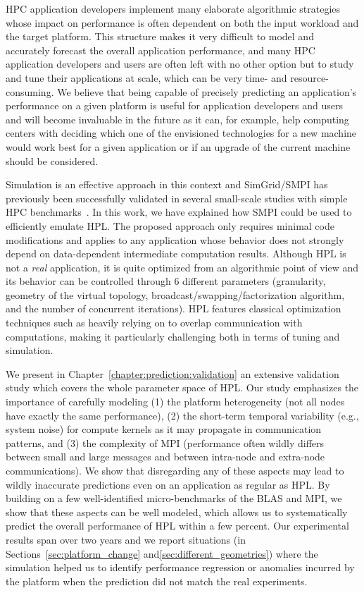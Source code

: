     HPC application developers implement many elaborate algorithmic strategies whose impact on performance is often
    dependent on both the input workload and the target platform. This structure makes it very difficult to model and
    accurately forecast the overall application performance, and many HPC application developers and users are often
    left with no other option but to study and tune their applications at scale, which can be very time- and
    resource-consuming. We believe that being capable of precisely predicting an application's performance on a given
    platform is useful for application developers and users and will become invaluable in the future as it can, for
    example, help computing centers with deciding which one of the envisioned technologies for a new machine would work
    best for a given application or if an upgrade of the current machine should be considered.

    Simulation is an effective approach in this context and SimGrid/SMPI has previously been successfully validated in
    several small-scale studies with simple HPC benchmarks~\cite{smpi,heinrich:hal-01523608}. In this work, we have
    explained how SMPI could be used to efficiently emulate HPL. The proposed approach only requires minimal code
    modifications and applies to any application whose behavior does not strongly depend on data-dependent intermediate
    computation results.  Although HPL is not a \emph{real} application, it is quite optimized from an algorithmic point
    of view and its behavior can be controlled through 6 different parameters (granularity, geometry of the virtual
    topology, broadcast/swapping/factorization algorithm, and the number of concurrent iterations). HPL features
    classical optimization techniques such as heavily relying on \iprobe to overlap communication with
    computations, making it particularly challenging both in terms of tuning and simulation.

    We present in Chapter~\ref{chapter:prediction:validation} an extensive validation study which covers the whole
    parameter space of HPL. Our study emphasizes the importance of carefully modeling (1) the platform heterogeneity
    (not all nodes have exactly the same performance), (2) the short-term temporal variability (e.g., system noise) for
    compute kernels as it may propagate in communication patterns, and (3) the complexity of MPI (performance often
    wildly differs between small and large messages and between intra-node and extra-node communications). We show that
    disregarding any of these aspects may lead to wildly inaccurate predictions even on an application as regular as
    HPL. By building on a few well-identified micro-benchmarks of the BLAS and MPI, we show that these aspects can be
    well modeled, which allows us to systematically predict the overall performance of HPL within a few percent. Our
    experimental results span over two years and we report situations (in Sections~\ref{sec:platform_change}
    and\ref{sec:different_geometries}) where the simulation helped us to identify performance regression or anomalies
    incurred by the platform when the prediction did not match the real experiments.

